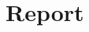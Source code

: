\documentclass[twoside,BCOR=12mm]{sty/idcthesis}
\begin{document}
\begin{spacing}{1}
    \pagestyle{empty}  \setcounter{page}{1}
    
%    
    \tableofcontents
\end{spacing}
\addchap{\abstractname}

\begin{spacing}{1}
    \addchap{\glossaryname}
    
\end{spacing}
%
\chapter{Report}
\label{chap:2_Latex}

%
%



%
%
%
%
%
\end{document}
